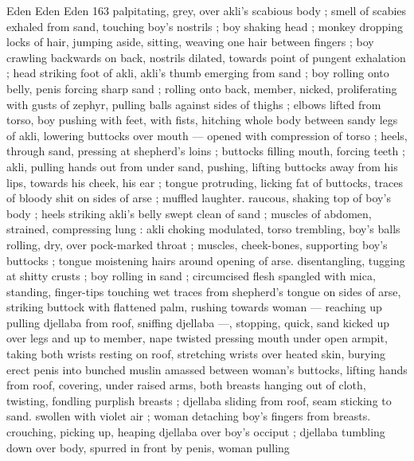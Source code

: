 Eden Eden Eden 163
palpitating, grey, over akli's scabious body ; smell of scabies exhaled
from sand, touching boy's nostrils ; boy shaking head ; monkey
dropping locks of hair, jumping aside, sitting, weaving one hair
between fingers ; boy crawling backwards on back, nostrils dilated,
towards point of pungent exhalation ; head striking foot of akli, akli’s
thumb emerging from sand ; boy rolling onto belly, penis forcing
sharp sand ; rolling onto back, member, nicked, proliferating with
gusts of zephyr, pulling balls against sides of thighs ; elbows lifted
from torso, boy pushing with feet, with fists, hitching whole body
between sandy legs of akli, lowering buttocks over mouth — opened
with compression of torso ; heels, through sand, pressing at
shepherd's loins ; buttocks filling mouth, forcing teeth ; akli, pulling
hands out from under sand, pushing, lifting buttocks away from his
lips, towards his cheek, his ear ; tongue protruding, licking fat of
buttocks, traces of bloody shit on sides of arse ; muffled laughter.
raucous, shaking top of boy’s body ; heels striking akli’s belly swept
clean of sand ; muscles of abdomen, strained, compressing lung :
akli choking modulated, torso trembling, boy's balls rolling, dry, over
pock-marked throat ; muscles, cheek-bones, supporting boy's
buttocks ; tongue moistening hairs around opening of arse.
disentangling, tugging at shitty crusts ; boy rolling in sand ;
circumcised flesh spangled with mica, standing, finger-tips touching
wet traces from shepherd's tongue on sides of arse, striking buttock
with flattened palm, rushing towards woman — reaching up pulling
djellaba from roof, sniffing djellaba —, stopping, quick, sand kicked
up over legs and up to member, nape twisted pressing mouth under
open armpit, taking both wrists resting on roof, stretching wrists over
heated skin, burying erect penis into bunched muslin amassed
between woman's buttocks, lifting hands from roof, covering, under
raised arms, both breasts hanging out of cloth, twisting, fondling
purplish breasts ; djellaba sliding from roof, seam sticking to sand.
swollen with violet air ; woman detaching boy's fingers from breasts.
crouching, picking up, heaping djellaba over boy's occiput ; djellaba
tumbling down over body, spurred in front by penis, woman pulling

